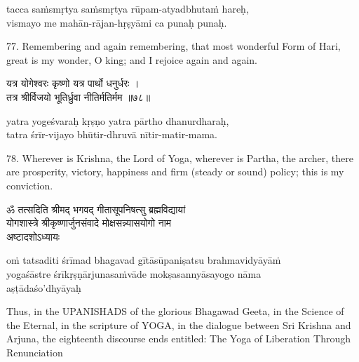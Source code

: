 \begin{transliteration}
tacca saṁsmṛtya saṁsmṛtya rūpam-atyadbhutaṁ hareḥ, \\
vismayo me mahān-rājan-hṛṣyāmi ca punaḥ punaḥ.
\end{transliteration}

77. Remembering and again remembering, that most wonderful Form of Hari, great
is my wonder, O king; and I rejoice again and again.

\begin{gitaverse}
यत्र योगेश्वरः कृष्णो यत्र पार्थो धनुर्धरः । \\
तत्र श्रीर्विजयो भूतिर्ध्रुवा नीतिर्मतिर्मम ॥७८॥
\end{gitaverse}

\begin{transliteration}
yatra yogeśvaraḥ kṛṣṇo yatra pārtho dhanurdharaḥ, \\
tatra śrīr-vijayo bhūtir-dhruvā nītir-matir-mama.
\end{transliteration}

78. Wherever is Krishna, the Lord of Yoga, wherever is Partha, the archer,
there are prosperity, victory, happiness and firm (steady or sound) policy;
this is my conviction.

\begin{gitaverse}
ॐ तत्सदिति श्रीमद् भगवद् गीतासूपनिषत्सु ब्रह्मविद्यायां \\
योगशास्त्रे श्रीकृष्णार्जुनसंवादे मोक्षसन्न्यासयोगो नाम \\
अष्टादशोऽध्यायः
\end{gitaverse}

\begin{transliteration}
oṁ tatsaditi śrīmad bhagavad gītāsūpaniṣatsu brahmavidyāyāṁ \\
yogaśāstre śrīkṛṣṇārjunasaṁvāde mokṣasannyāsayogo nāma \\
aṣṭādaśo'dhyāyaḥ
\end{transliteration}

Thus, in the UPANISHADS of the glorious Bhagawad Geeta, in the Science of the
Eternal, in the scripture of YOGA, in the dialogue between Sri Krishna and
Arjuna, the eighteenth discourse ends entitled: The Yoga of Liberation Through
Renunciation
